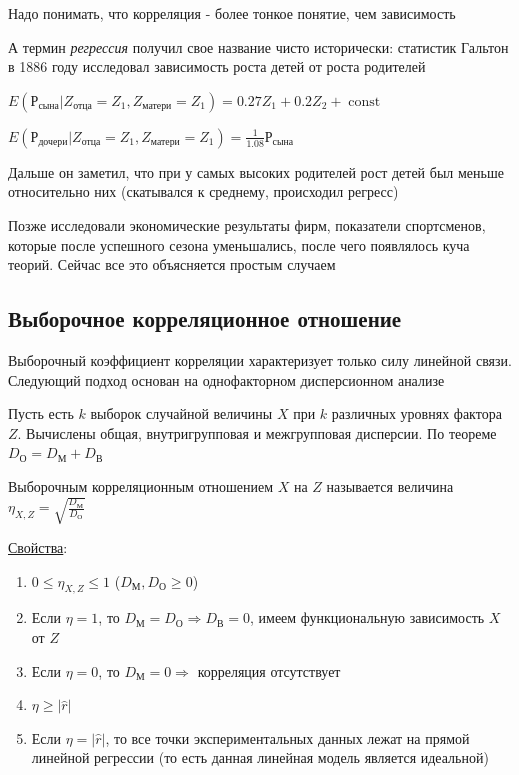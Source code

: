 \documentclass[12pt]{article}
\begin{document}
Надо понимать, что корреляция - более тонкое понятие, чем зависимость

А термин \textit{регрессия} получил свое название чисто исторически: статистик Гальтон в 1886 году 
исследовал зависимость роста детей от роста родителей

$E(\text{Р}_\text{сына} | Z_\text{отца} = Z_1, Z_\text{матери} = Z_1) = 0.27 Z_1 + 0.2 Z_2 + \operatorname{const}$

$E(\text{Р}_\text{дочери} | Z_\text{отца} = Z_1, Z_\text{матери} = Z_1) = \frac{1}{1.08} \text{Р}_\text{сына}$

Дальше он заметил, что при у самых высоких родителей рост детей был меньше относительно них (скатывался к среднему, происходил регресс)

Позже исследовали экономические результаты фирм, показатели спортсменов, которые после успешного сезона уменьшались, 
после чего появлялось куча теорий. Сейчас все это объясняется простым случаем

\subsection{Выборочное корреляционное отношение}

\hypertarget{selective_correlational_relation}{}

Выборочный коэффициент корреляции характеризует только силу линейной связи. Следующий подход основан на однофакторном дисперсионном анализе

Пусть есть $k$ выборок случайной величины $X$ при $k$ различных уровнях фактора $Z$. Вычислены общая, внутригрупповая и межгрупповая дисперсии. 
По теореме $D_\text{О} = D_\text{М} + D_\text{В}$

\Def Выборочным корреляционным отношением $X$ на $Z$ называется величина $\eta_{X, Z} = \sqrt{\frac{D_\text{М}}{D_\text{О}}}$

\underline{Свойства}:

\begin{enumerate}
    \item $0 \leq \eta_{X, Z} \leq 1$ ($D_\text{М}, D_\text{О} \geq 0$)

    \item Если $\eta = 1$, то $D_\text{М} = D_\text{О} \Longrightarrow D_\text{В} = 0$, имеем функциональную зависимость $X$ от $Z$

    \item Если $\eta = 0$, то $D_\text{М} = 0 \Longrightarrow$ корреляция отсутствует

    \item $\eta \geq |\hat r|$

    \item Если $\eta = |\hat r|$, то все точки экспериментальных данных лежат на прямой линейной регрессии 
    (то есть данная линейная модель является идеальной)

\end{enumerate}
\end{document}
